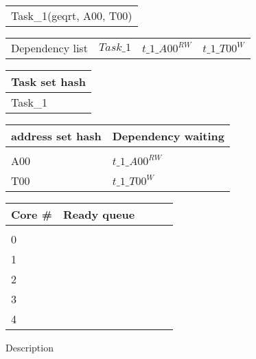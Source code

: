 \documentclass{article}
\begin{document}


\begin{figure}

\begin{minipage}{1.0\linewidth}
\begin{tabular}{l}
Task\_1(geqrt, A00, T00)
\end{tabular}
\end{minipage}

\begin{minipage}{1.0\linewidth}
\begin{tabular}{l | l  l l }
Dependency list & $Task\_1$ & \cellcolor{LimeGreen} $t\_1\_A00^{RW}$ & \cellcolor{LimeGreen} $t\_1\_T00^{W}$
\end{tabular}
\end{minipage}

\begin{minipage}{1.0\linewidth}
\begin{tabular}{l}
Task set hash\\
\hline
\cellcolor{LimeGreen}Task\_1
\end{tabular}
\end{minipage}

\begin{minipage}{1.0\linewidth}
\begin{tabular}{l | l}
address set hash& Dependency waiting\\
\hline
    &                 \\
A00 & \cellcolor{LimeGreen} $t\_1\_A00^{RW}$\\
T00 & \cellcolor{LimeGreen} $t\_1\_T00^{W}$\\
\end{tabular}
\end{minipage}

\begin{minipage}{1.0\linewidth}
\begin{tabular}{l | l l l l}
Core \# & Ready queue\\
\hline
&\\
0 & & & &\\
1 & & & &\\
2 & & & &\\
3 & & & &\\
4 & & & &\\
\end{tabular}
\end{minipage}

\begin{minipage}{1.0\linewidth}
Description


\end{minipage}
\end{figure}
\end{document}
